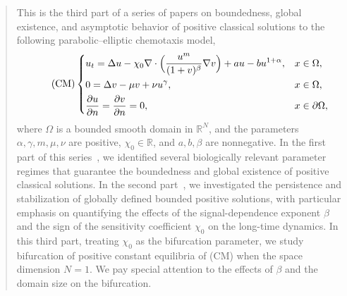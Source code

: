 \documentclass[11pt]{article} %
\theoremstyle{remark}
\theoremstyle{remark}
\numberwithin{equation}{section}
\numberwithin{figure}{section}
\numberwithin{table}{section}
\begin{document}
\begin{abstract}
  This is the third part of a series of papers on boundedness, global existence,
  and asymptotic behavior of positive classical solutions to the following
  parabolic--elliptic chemotaxis model,
  \begin{equation}\label{E:main-abstract-eq}\tag{CM}
    \begin{dcases}
      u_t=\Delta u- \chi_0\nabla \cdot\Big(\frac{u^m}{(1+v)^\beta}\nabla v\Big)+au-b u^{1+\alpha}, & x \in \Omega, \\
      0=\Delta v-\mu v+\nu u^\gamma,                                                               & x \in \Omega, \\
      \frac{\partial u}{\partial n}=\frac{\partial v}{\partial n}=0,                               & x \in \partial\Omega,
    \end{dcases}
  \end{equation}
  where $\Omega$ is a bounded smooth domain in $\mathbb{R}^N$, and the
  parameters $\alpha, \gamma, m, \mu, \nu$ are positive, $\chi_0 \in
  \mathbb{R}$, and $a, b, \beta$ are nonnegative. In the first part of this
  series~\cite{chen.ruau.ea:26:chemotaxis*1}, we identified several biologically
  relevant parameter regimes that guarantee the boundedness and global existence
  of positive classical solutions. In the second
  part~\cite{chen.ruau.ea:26:chemotaxis}, we investigated the persistence and
  stabilization of globally defined bounded positive solutions, with particular
  emphasis on quantifying the effects of the signal-dependence exponent $\beta$
  and the sign of the sensitivity coefficient $\chi_0$ on the long-time
  dynamics. In this third part, treating $\chi_0$ as the bifurcation parameter,
  we study bifurcation of positive constant equilibria of (CM) when the space
  dimension $N = 1$. We pay special attention to the effects of $\beta$ and the
  domain size on the bifurcation.


\end{abstract}
\end{document}
